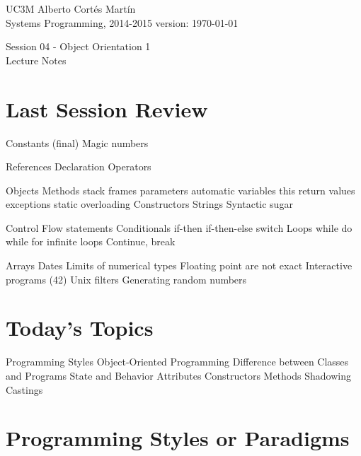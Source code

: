 \documentclass[a4paper, 9pt]{extarticle}
\newcommand{\realtitle}{Session 04 - Object Orientation 1}
\begin{document}
\makebox[\linewidth]{\rule{\textwidth}{0.4pt}}
UC3M \hfill Alberto Cortés Martín\\
Systems Programming, 2014-2015 \hfill version: \today\\
\makebox[\linewidth]{\rule{\textwidth}{0.4pt}}
\begin{center}
  \Large{\realtitle}\\Lecture Notes
\end{center}
\makebox[\linewidth]{\rule{\textwidth}{0.4pt}}
\vspace{1cm}

\section{Last Session Review}

\begin{blackboard}
Constants (final)
  Magic numbers

References
  Declaration
  Operators

Objects
  Methods
    stack frames
    parameters
      automatic variables
      this
    return values
    exceptions
    static
    overloading
  Constructors
  Strings
    Syntactic sugar

Control Flow statements
  Conditionals
    if-then
      if-then-else
    switch
  Loops
    while
    do while
    for
    infinite loops
  Continue, break

Arrays
Dates
Limits of numerical types
Floating point are not exact
Interactive programs (42)
Unix filters
Generating random numbers
\end{blackboard}




\section{Today's Topics}
\begin{blackboard}
Programming Styles
Object-Oriented Programming
Difference between Classes and Programs
State and Behavior
Attributes
Constructors
Methods
Shadowing
Castings
\end{blackboard}










\section{Programming Styles or Paradigms}
\end{document}
